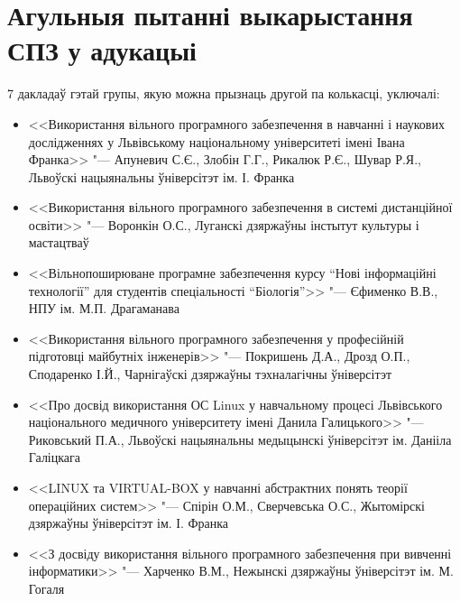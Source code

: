 \documentclass[10pt, a5paper]{article}
\begin{document}
\section*{Агульныя пытанні выкарыстання СПЗ у адукацыі}
7 дакладаў гэтай групы, якую можна прызнаць другой па колькасці, уключалі:
\begin{itemize}
\item <<Використання вільного програмного забезпечення в навчанні і наукових дослідженнях у Львівському національному уні\-вер\-ситеті імені Івана Франка>> "--- Апуневич С.Є., Злобін Г.Г., Рикалюк Р.Є., Шувар Р.Я., Львоўскі нацыянальны ўніверсітэт ім. І. Франка
\item <<Використання вільного програмного забезпечення в системі дистанційної освіти>> "--- Воронкін О.С., Луганскі дзяржаўны інстытут культуры і мастацтваў
\item <<Вільнопоширюване програмне забезпечення курсу “Нові інформаційні технології” для студентів спеціальності \linebreak “Біо\-ло\-гія”>> "--- Єфименко В.В., НПУ ім. М.П. Драгаманава
\item <<Використання вільного програмного забез\-печення у про\-фе\-сій\-ній підготовці майбутніх інженерів>> "--- Покришень Д.А., \linebreak Дрозд О.П., Сподаренко І.Й., Чарнігаўскі дзяржаўны тэхналагічны ўніверсітэт
\item  <<Про досвід використання ОС Linux у навчальному процесі Львівського національного медичного університету імені Данила Галицького>> "--- Риковський П.А., Львоўскі нацыянальны медыцынскі ўніверсітэт ім. Данііла Галіцкага
\item  <<LINUX  та VIRTUAL-BOX у навчанні абстрактних понять теорії операційних систем>> "--- Спірін О.М., Сверчевська О.С., Жытомірскі дзяржаўны ўніверсітэт ім. І. Франка
\item  <<З досвіду використання вільного програмного забезпечення при вивченні інформатики>> "--- Харченко В.М., Нежынскі дзяржаўны ўніверсітэт ім. М. Гогаля
\end{itemize}
\end{document}
